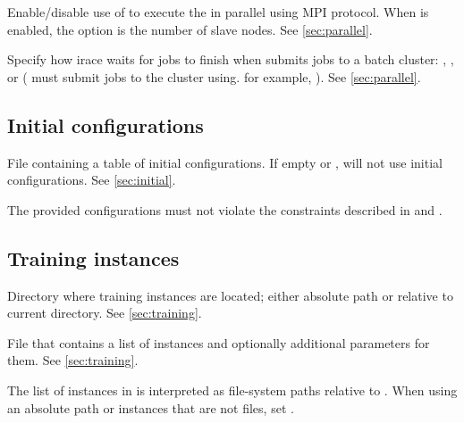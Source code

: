 \begin{description}
  Enable/disable use of  to execute the  in parallel using MPI protocol. When  is enabled, the option  is the number of slave nodes. See \autoref{sec:parallel}.

  Specify how irace waits for jobs to finish when  submits jobs to a batch cluster: , ,  or  ( must submit jobs to the cluster using. for example, ). See \autoref{sec:parallel}.

\end{description}

\subsection[Initial configurations]{Initial configurations}
\begin{description}
File containing a table of initial configurations. If empty or , \irace will not use initial configurations. See \autoref{sec:initial}.
\begin{xwarningbox}
The provided configurations must not violate the constraints described in  and .
\end{xwarningbox}

\end{description}

\subsection[Training instances]{Training instances}
\begin{description}
Directory where training instances are located; either absolute path or relative to current directory. See \autoref{sec:training}.

File that contains a list of instances and optionally additional parameters for them. See \autoref{sec:training}.
\begin{xwarningbox}
The list of instances in  is interpreted as file-system paths  relative to . When using an absolute path or instances that are not files, set .
\end{xwarningbox}

\end{description}

